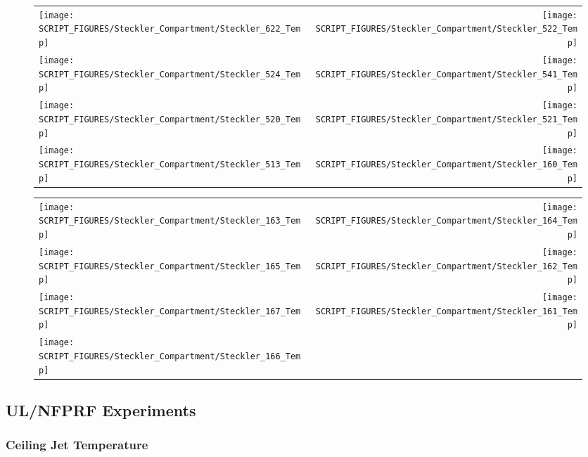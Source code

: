 \begin{figure}[p]
\begin{tabular*}{\textwidth}{l@{\extracolsep{\fill}}r}
\texttt{[image: SCRIPT\_FIGURES/Steckler\_Compartment/Steckler\_622\_Temp]} &
\texttt{[image: SCRIPT\_FIGURES/Steckler\_Compartment/Steckler\_522\_Temp]} \\
\texttt{[image: SCRIPT\_FIGURES/Steckler\_Compartment/Steckler\_524\_Temp]} &
\texttt{[image: SCRIPT\_FIGURES/Steckler\_Compartment/Steckler\_541\_Temp]} \\
\texttt{[image: SCRIPT\_FIGURES/Steckler\_Compartment/Steckler\_520\_Temp]} &
\texttt{[image: SCRIPT\_FIGURES/Steckler\_Compartment/Steckler\_521\_Temp]} \\
\texttt{[image: SCRIPT\_FIGURES/Steckler\_Compartment/Steckler\_513\_Temp]} &
\texttt{[image: SCRIPT\_FIGURES/Steckler\_Compartment/Steckler\_160\_Temp]}
\end{tabular*}
\end{figure}

\begin{figure}[p]
\begin{tabular*}{\textwidth}{l@{\extracolsep{\fill}}r}
\texttt{[image: SCRIPT\_FIGURES/Steckler\_Compartment/Steckler\_163\_Temp]} &
\texttt{[image: SCRIPT\_FIGURES/Steckler\_Compartment/Steckler\_164\_Temp]} \\
\texttt{[image: SCRIPT\_FIGURES/Steckler\_Compartment/Steckler\_165\_Temp]} &
\texttt{[image: SCRIPT\_FIGURES/Steckler\_Compartment/Steckler\_162\_Temp]} \\
\texttt{[image: SCRIPT\_FIGURES/Steckler\_Compartment/Steckler\_167\_Temp]} &
\texttt{[image: SCRIPT\_FIGURES/Steckler\_Compartment/Steckler\_161\_Temp]} \\
\texttt{[image: SCRIPT\_FIGURES/Steckler\_Compartment/Steckler\_166\_Temp]}
\end{tabular*}
\end{figure}

\clearpage

\subsection{UL/NFPRF Experiments}

\subsubsection{Ceiling Jet Temperature}

